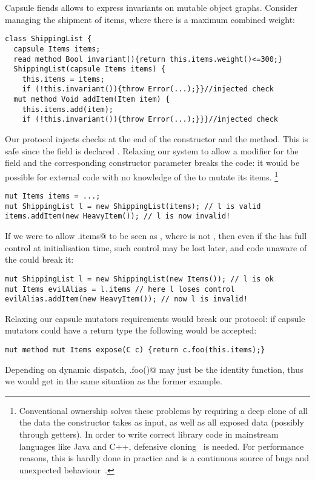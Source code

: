 Capsule fiends allows to express invariants on mutable object graphs.
Consider managing the shipment of items, where there is a maximum combined weight:
\begin{lstlisting}
class ShippingList {
  capsule Items items;
  read method Bool invariant(){return this.items.weight()<=300;}
  ShippingList(capsule Items items) {
    this.items = items;
    if (!this.invariant()){throw Error(...);}}//injected check
  mut method Void addItem(Item item) {
    this.items.add(item);
    if (!this.invariant()){throw Error(...);}}}//injected check
\end{lstlisting}

Our protocol injects \Q@invariant@ checks at the end of the constructor and the \Q@addItem@ method.
This is safe since the \Q@items@ field is declared \Q@capsule@.
Relaxing our system to allow a \Q@mut@ modifier for
the \Q@items@ field and the corresponding constructor parameter 
breaks the code:
it would be possible for external code with no knowledge of the \Q@ShippingList@ to mutate its items.%
\footnote{%
Conventional ownership solves these problems by requiring a deep clone of all the data the constructor takes as input, as well as all exposed data (possibly through getters).
In order to write correct library code in mainstream languages like Java and C++, defensive cloning~\cite{Bloch08} is needed.
For performance reasons, this is hardly done in practice and is a continuous source of bugs and unexpected behaviour~\cite{Bloch08}.%
}
\begin{lstlisting}
mut Items items = ...;
mut ShippingList l = new ShippingList(items); // l is valid
items.addItem(new HeavyItem()); // l is now invalid!
\end{lstlisting}
If we were to allow \Q@x.items@ to be seen as \Q@mut@, where \Q@x@ is not \Q@this@, then  even if the \Q@ShippingList@ has full control at initialisation time, such control may be lost later, and code unaware of the \Q@ShippingList@ could break it:
\begin{lstlisting}
mut ShippingList l = new ShippingList(new Items()); // l is ok
mut Items evilAlias = l.items // here l loses control
evilAlias.addItem(new HeavyItem()); // now l is invalid!
\end{lstlisting}
Relaxing our capsule mutators requirements
would break our protocol: if capsule mutators could have a \Q@mut@ return type the following would be accepted:
\begin{lstlisting}
mut method mut Items expose(C c) {return c.foo(this.items);}
\end{lstlisting}
Depending on dynamic dispatch, \Q@c.foo()@ may just be the identity function, thus
we would get in the same situation as the former example.


